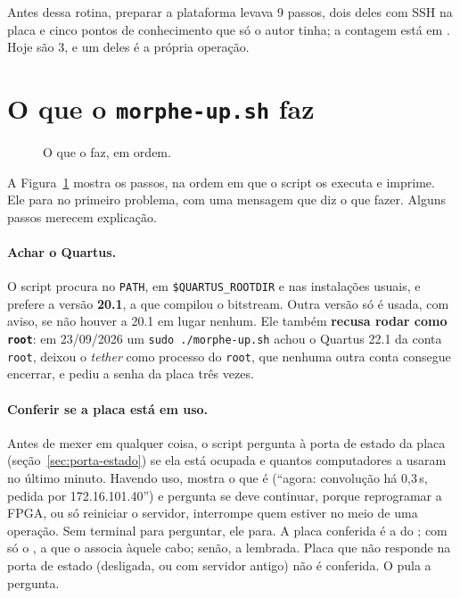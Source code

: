 Antes dessa rotina, preparar a plataforma levava 9 passos, dois deles com SSH
na placa e cinco pontos de conhecimento que só o autor tinha; a contagem está
em . Hoje são 3, e um deles é a própria
operação.

\section{O que o \texttt{morphe-up.sh} faz}

\begin{figure}[htbp]
  \centering
  \caption{O que o  faz, em ordem.}
  \label{fig:morphe-up}
\end{figure}

A Figura~\ref{fig:morphe-up} mostra os passos, na ordem em que o script os
executa e imprime. Ele para no primeiro problema, com uma mensagem que diz o
que fazer. Alguns passos merecem explicação.

\paragraph{Achar o Quartus.} O script procura no \texttt{PATH}, em
\texttt{\$QUARTUS\_ROOTDIR} e nas instalações usuais, e prefere a versão
\textbf{20.1}, a que compilou o bitstream. Outra versão só é usada, com aviso,
se não houver a 20.1 em lugar nenhum. Ele também \textbf{recusa rodar como
\texttt{root}}: em 23/09/2026 um \texttt{sudo ./morphe-up.sh} achou o Quartus
22.1 da conta \texttt{root}, deixou o \emph{tether} como processo do
\texttt{root}, que nenhuma outra conta consegue encerrar, e pediu a senha da
placa três vezes.

\paragraph{Conferir se a placa está em uso.} Antes de mexer em qualquer coisa,
o script pergunta à porta de estado da placa (seção~\ref{sec:porta-estado}) se
ela está ocupada e quantos computadores a usaram no último minuto. Havendo uso,
mostra o que é (``agora: convolução há 0,3\,s, pedida por 172.16.101.40'') e
pergunta se deve continuar, porque reprogramar a FPGA, ou só reiniciar o
servidor, interrompe quem estiver no meio de uma operação. Sem terminal para
perguntar, ele para. A placa conferida é a do ; com só o
, a que o  associa àquele cabo; senão, a lembrada.
Placa que não responde na porta de estado (desligada, ou com servidor antigo)
não é conferida. O  pula a pergunta.

